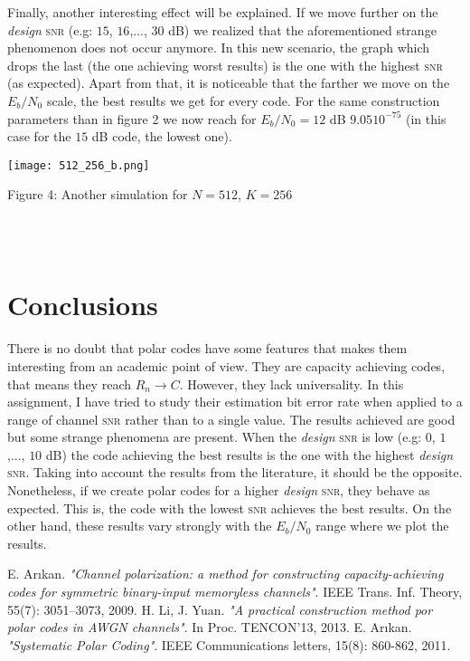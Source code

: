 \documentclass{article}
\begin{document}
\vspace{0.25cm}
Finally, another interesting effect will be explained. If we move further on the \textit{design} \textsc{snr} (e.g: $15$, $16$,..., $30$ dB) we realized that the aforementioned strange phenomenon does not occur anymore. In this new scenario, the graph which drops the last (the one achieving worst results) is the one with the highest \textsc{snr} (as expected). Apart from that, it is noticeable that the farther we move on the  $E_b/N_0$ scale, the best results we get for every code. For the same construction parameters than in figure 2 we now reach for $E_b/N_0=12$ dB \approx $ 9.05$\cdot $10^{-75}$ (in this case for the $15$ dB code, the lowest one).

\begin{center}
 \texttt{[image: 512\_256\_b.png]}
 \centerline{Figure 4: Another simulation for $N=512$, $K=256$}
\end{center}  
\\\\
\section{Conclusions}
There is no doubt that polar codes have some features that makes them interesting from an academic point of view. They are capacity achieving codes, that means they reach $R_n \to C$.
However, they lack universality. In this assignment, I have tried to study their estimation bit error rate when applied to a range of channel \textsc{snr} rather than to a single value. The results achieved are good but some strange phenomena are present. When the \textit{design} \textsc{snr} is low (e.g: $0$, $1$,..., $10$ dB) the code achieving the best results is the one with the highest \textit{design} \textsc{snr}. Taking into account the results from the literature, it should be the opposite. Nonetheless, if we create polar codes for a higher \textit{design} \textsc{snr}, they behave as expected. This is, the code with the lowest \textsc{snr} achieves the best results. On the other hand, these results vary strongly with the $E_b/N_0$ range where we plot the results.
\begin{thebibliography}{9}

  E. Arıkan. \textit{"Channel polarization: a method for constructing capacity-achieving codes for symmetric binary-input memoryless channels"}. IEEE Trans. Inf. Theory, 55(7): 3051–3073, 2009.
H. Li, J. Yuan. \textit{"A practical construction method por polar codes in AWGN channels"}. In Proc. TENCON'13, 2013.
  E. Arıkan. \textit{"Systematic Polar Coding"}. IEEE Communications letters, 15(8): 860-862, 2011.
\end{thebibliography}
\end{document}
